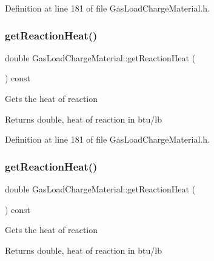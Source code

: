 Definition at line 181 of file Gas\+Load\+Charge\+Material.\+h.

\mbox{\label{class_gas_load_charge_material_a605eaf21d1f25f27b53627aeb903c93d}} 
\subsubsection{\texorpdfstring{get\+Reaction\+Heat()}{getReactionHeat()}\hspace{0.1cm}{\footnotesize\ttfamily [2/3]}}
{\footnotesize\ttfamily double Gas\+Load\+Charge\+Material\+::get\+Reaction\+Heat (\begin{DoxyParamCaption}{ }\end{DoxyParamCaption}) const\hspace{0.3cm}{\ttfamily [inline]}}

Gets the heat of reaction \begin{DoxyReturn}{Returns}
double, heat of reaction in btu/lb 
\end{DoxyReturn}


Definition at line 181 of file Gas\+Load\+Charge\+Material.\+h.

\mbox{\label{class_gas_load_charge_material_a605eaf21d1f25f27b53627aeb903c93d}} 
\subsubsection{\texorpdfstring{get\+Reaction\+Heat()}{getReactionHeat()}\hspace{0.1cm}{\footnotesize\ttfamily [3/3]}}
{\footnotesize\ttfamily double Gas\+Load\+Charge\+Material\+::get\+Reaction\+Heat (\begin{DoxyParamCaption}{ }\end{DoxyParamCaption}) const\hspace{0.3cm}{\ttfamily [inline]}}

Gets the heat of reaction \begin{DoxyReturn}{Returns}
double, heat of reaction in btu/lb 
\end{DoxyReturn}


